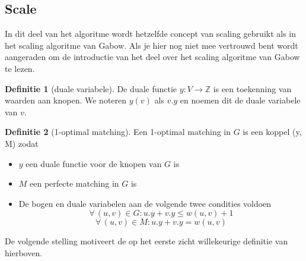 \documentclass[conference]{IEEEtran}
\theoremstyle{definition}
\newtheorem{definition}{Definitie}[section]
\theoremstyle{remark}
\let \oldforall \forall
\renewcommand{\forall}{\oldforall\,}
\begin{document}
\subsection{Scale}
In dit deel van het algoritme wordt hetzelfde concept van scaling gebruikt als in het scaling algoritme van Gabow. Als je hier nog niet mee vertrouwd bent wordt aangeraden om de introductie van het deel over het scaling algoritme van Gabow te lezen.
\begin{definition}[duale variabele]
    De duale functie $y: V \longrightarrow \mathbb{Z}$ is een toekenning van waarden aan knopen. We noteren $y(v)$ als $v.y$ en noemen dit de duale variabele van $v$.
\end{definition}
\begin{definition}[1-optimal matching]
    Een 1-optimal matching in $G$ is een koppel (y, M) zodat
    \begin{itemize}
        \item $y$ een duale functie voor de knopen van $G$ is
        \item $M$ een perfecte matching in $G$ is
        \item De bogen en duale variabelen aan de volgende twee condities voldoen
            \begin{equation}
                \forall (u, v) \in G: u.y + v.y \leq w(u, v) + 1 \label{eq:def:oneOpt1}
            \end{equation}
            \begin{equation}
                \forall (u, v) \in M: u.y + v.y = w(u, v) \label{eq:def:oneOpt2}
            \end{equation}
    \end{itemize}
\end{definition}

De volgende stelling motiveert de op het eerste zicht willekeurige definitie van hierboven.
\end{document}

